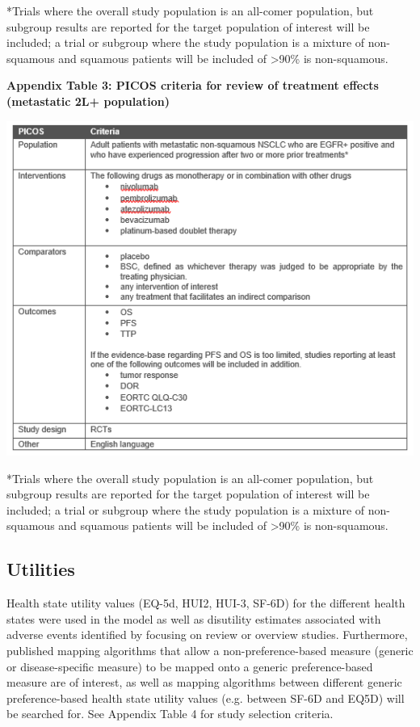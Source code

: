 \documentclass[11pt,final,fleqn]{article}\usepackage[]{graphicx}\usepackage[]{color}
\theoremstyle{plain}
\begin{document}
{\begin{appendices}
*Trials where the overall study population is an all-comer population, but subgroup results are reported for the target population of interest will be included; a trial or subgroup where the study population is a mixture of non-squamous and squamous patients will be included of >90\% is non-squamous.

\textbf{Appendix Table 3: PICOS criteria for review of treatment effects (metastatic 2L+ population)}

\includegraphics[scale=1]{tables/picos-metastatic-2LP.png}

*Trials where the overall study population is an all-comer population, but subgroup results are reported for the target population of interest will be included; a trial or subgroup where the study population is a mixture of non-squamous and squamous  patients will be included of >90\% is non-squamous. 

\subsection{Utilities}

Health state utility values (EQ-5d, HUI2, HUI-3, SF-6D) for the different health states were used in the model as well as disutility estimates associated with adverse events identified by focusing on review or overview studies. Furthermore, published mapping algorithms that allow a non-preference-based measure (generic or disease-specific measure) to be mapped onto a generic preference-based measure are of interest, as well as mapping algorithms between different generic preference-based health state utility values (e.g. between SF-6D and EQ5D) will be searched for. See Appendix Table 4 for study selection criteria.


\end{appendices}}
\end{document}
